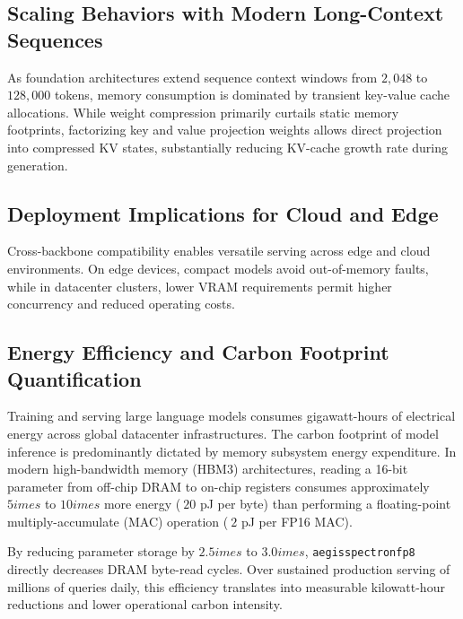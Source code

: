 \subsection{Scaling Behaviors with Modern Long-Context Sequences}
As foundation architectures extend sequence context windows from $2{,}048$ to $128{,}000$ tokens, memory consumption is dominated by transient key-value cache allocations. While weight compression primarily curtails static memory footprints, factorizing key and value projection weights allows direct projection into compressed KV states, substantially reducing KV-cache growth rate during generation.

\subsection{Deployment Implications for Cloud and Edge}
Cross-backbone compatibility enables versatile serving across edge and cloud environments. On edge devices, compact models avoid out-of-memory faults, while in datacenter clusters, lower VRAM requirements permit higher concurrency and reduced operating costs.

\subsection{Energy Efficiency and Carbon Footprint Quantification}
Training and serving large language models consumes gigawatt-hours of electrical energy across global datacenter infrastructures. The carbon footprint of model inference is predominantly dictated by memory subsystem energy expenditure. In modern high-bandwidth memory (HBM3) architectures, reading a 16-bit parameter from off-chip DRAM to on-chip registers consumes approximately $5	imes$ to $10	imes$ more energy ($~20$ pJ per byte) than performing a floating-point multiply-accumulate (MAC) operation ($~2$ pJ per FP16 MAC).

By reducing parameter storage by $2.5	imes$ to $3.0	imes$, \texttt{aegisspectronfp8} directly decreases DRAM byte-read cycles. Over sustained production serving of millions of queries daily, this efficiency translates into measurable kilowatt-hour reductions and lower operational carbon intensity.
